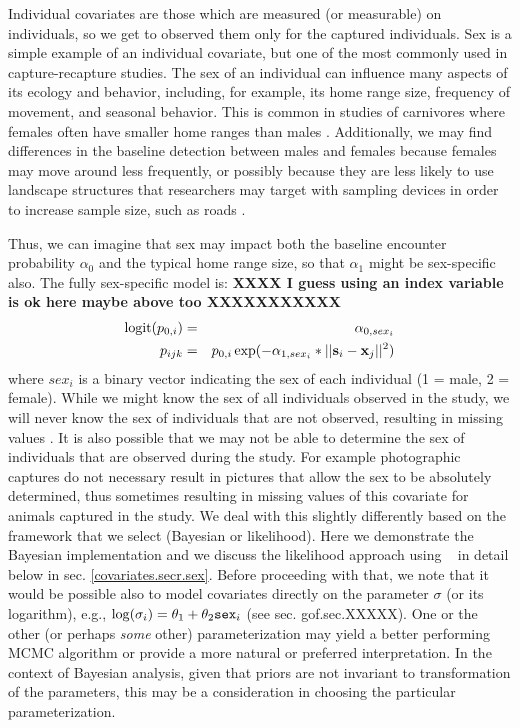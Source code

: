 Individual covariates are those which are measured (or measurable) on
individuals, so we get to observed them only for the captured
individuals. Sex is a simple example of an individual covariate, but
one of the most commonly used in capture-recapture studies. 
The sex of an individual can influence many aspects of its ecology and
behavior, including, for example, its home range size, frequency of
movement, and seasonal behavior. This is common in studies of
carnivores where females often have smaller home ranges than males
\citep{gardner_etal:2010jwm, sollmann_etal:2011}. Additionally, we may
find differences in the baseline detection between males and females
because females may move around less frequently, or possibly because
they are less likely to use landscape structures that researchers may
target with sampling devices in order to increase sample size, such as
roads \citep[e.g.][]{salom-perez_etal:2007}.

Thus, we can imagine that sex may impact both the baseline encounter
probability $\alpha_{0}$ and the typical home range
size, so that
$\alpha_{1}$ might be sex-specific also.  The fully sex-specific model is:
{\bf XXXX I guess using an index variable is ok here  maybe above too XXXXXXXXXXX}
\begin{eqnarray*}
\mbox{logit}(p_{0,i}) &= &\alpha_{0,sex_{i}}  \\
p_{ijk} &= &p_{0,i} \exp(- \alpha_{1, sex_{i}}*||{\bf s}_{i}-{\bf x}_{j}||^2)
\end{eqnarray*}
where $sex_{i}$ is a binary vector indicating the sex of
each individual (1 = male, 2 = female).  While we might know the sex of all
individuals observed in the study, we will never know the
sex of individuals that are not observed,
resulting in missing values \citep{gardner_etal:2010jwm}.
It is also possible that we may not be able to determine the sex of
individuals that are observed during the study. For example photographic
captures do not necessary result in pictures that allow the sex to be absolutely
determined, thus sometimes resulting in missing values of this covariate for animals
captured in the study.   We deal with this slightly differently based on the framework
that we select (Bayesian or likelihood).  Here we demonstrate the Bayesian implementation 
and we discuss the likelihood approach using \secr~ in detail
below in sec. \ref{covariates.secr.sex}.
Before proceeding with that, we note that it would be possible also to
model covariates directly on the parameter $\sigma$ (or its
logarithm), e.g., $\log(\sigma_{i}) = \theta_{1} + \theta_{2}
\mbox{\tt sex}_{i}$ (see sec. gof.sec.XXXXX). One or the other (or perhaps {\it some} other)
parameterization may yield a better performing MCMC algorithm or provide a
more natural or preferred interpretation.
In the context of Bayesian analysis, given that priors are not
invariant to transformation of the parameters, this may be a
consideration in choosing the particular parameterization.


